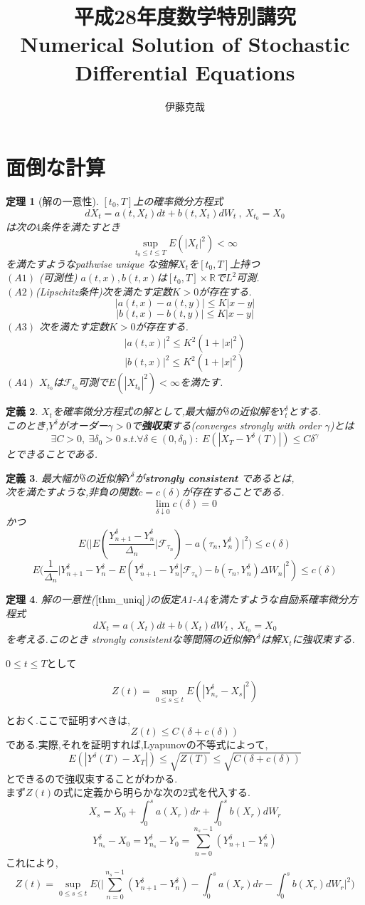 \documentclass[a4paper,dvipdfmx]{jreport}
\title{平成28年度数学特別講究\\Numerical Solution of Stochastic Differential Equations}
\author{伊藤克哉}
\def\qedsymbol{$\square$}
\def\proofname{\gt{証明}\;}
\newenvironment{Proof}{\par\noindent{\it\proofname}}{{\unskip\nobreak\hfill{\it\qedsymbol}}\par\vskip 9pt}
\newtheorem{Thm}     {定理}
\newtheorem{Def}     [Thm]{定義}
\renewenvironment{leftbar}{%
  \def\FrameCommand{\vrule width 1pt \hspace{10pt}}%
  \MakeFramed {\advance\hsize-\width \FrameRestore}}%
 {\endMakeFramed}
\def\R{\mathbb R}
\def\F{\mathcal F}
\def\thm{\begin{leftbar}\begin{Thm}}
\def\thmx{\end{Thm}\end{leftbar}}
\def\defb{\begin{leftbar}\begin{Def}}
\def\defx{\end{Def}\end{leftbar}}
\def\proof{\begin{Proof}}
\def\gt{>}
\begin{document}
\section{面倒な計算}
\thm[解の一意性]
\label{thm_uniq}
$[t_0,T]$上の確率微分方程式
\[
dX_t = a(t,X_t)dt + b(t,X_t)dW_t \ ,\ X_{t_0} =X_0
\]
は次の$4$条件を満たすとき
\[
\sup_{t_0\le t\le T} E(|X_t|^2) < \infty
\]
を満たすようなpathwise unique な強解$X_t$を$[t_0,T]$上持つ\\
$(A1)$ (可測性) $a(t,x),b(t,x)$は$[t_0,T] \times\R$で$L^2$可測.\\
$(A2)$(Lipschitz条件)次を満たす定数$K>0$が存在する.
\[
|a(t,x) - a(t,y) | \le K |x-y|
\]
\[
|b(t,x) - b(t,y) | \le K |x-y|
\]
$(A3)$ 次を満たす定数$K>0$が存在する.
\[
|a(t,x)|^2 \le K^2 (1+|x|^2)
\]
\[
|b(t,x)|^2 \le K^2 (1+|x|^2)
\]
$(A4)$
$X_{t_0}$は$\F_{t_0}$可測で$E(|X_{t_0}|^2)<\infty$を満たす.
\thmx
\defb
$X_t$を確率微分方程式の解として,最大幅が$\delta$の近似解を$Y_t^\delta$とする.\\
このとき,$Y^\delta$がオーダー$\gamma > 0$で{\bf 強収束}する(converges strongly with order $\gamma$)とは
\[
\exists C > 0 ,\ \exists \delta_0 > 0 \ s.t.  \forall \delta \in (0,\delta_0) : \ E(|X_T - Y^\delta(T) | ) \le C\delta^\gamma
\]
とできることである.
\defx

\defb
最大幅が$\delta$の近似解$Y^\delta$が{\bf strongly consistent} であるとは,\\
次を満たすような,非負の関数$c = c(\delta)$が存在することである.
\[
\lim_{\delta \downarrow 0} c(\delta) = 0 
\]
かつ
\[
E \big( \big| E( \frac{Y^\delta_{n+1} - Y^\delta_n}{\Delta_n} | \F_{\tau_n})
- a(\tau_n,Y_n^\delta)
 \big|^2 \big)   \le c(\delta)
\]
\[
E(\frac{1}{\Delta_n} | Y^\delta_{n+1} - Y^\delta_n
- E(Y^\delta_{n+1} - Y^\delta_n | \F_{\tau_n})
- b(\tau_n,Y_n^\delta)\Delta W_n|^2) \le c(\delta)
\]
\defx
\thm

解の一意性($\ref{thm_uniq}$)の仮定A1-A4を満たすような自励系確率微分方程式
\[
dX_t = a(X_t)dt + b(X_t)dW_t \ ,\ X_{t_0} =X_0
\]
を考える.このとき strongly consistentな等間隔の近似解$Y^\delta$は解$X_t$に強収束する.
\thmx
\proof

$0 \le t \le T$として

\[
Z(t) = \sup_{0\le s\le t} E(|Y_{n_s}^\delta - X_s|^2)
\]

とおく.ここで証明すべきは,
\[
Z(t) \le C(\delta + c(\delta))
\]
である.実際,それを証明すれば,Lyapunovの不等式によって,
\[
E(|Y^\delta(T) - X_T|) \le \sqrt{Z(T)} \le \sqrt{C(\delta+c(\delta))}
\]
とできるので強収束することがわかる.\\
まず$Z(t)$の式に定義から明らかな次の2式を代入する.
\[
X_s = X_0 + \int_0^s a(X_r)dr + \int_0^s b(X_r) dW_r
\]
\[
Y_{n_s}^\delta - X_0 =  Y_{n_s}^\delta - Y_0 = \sum_{n=0}^{n_s-1}(Y_{n+1}^\delta - Y_n^\delta)
\]
これにより,
\[
Z(t) = \sup_{0\le s\le t}  E 
\big(  \big|
 \sum_{n=0}^{n_s-1}(Y_{n+1}^\delta - Y_n^\delta) - \int_0^s a(X_r)dr - \int_0^s b(X_r) dW_r
\big| ^2 \big)
\]
\end{document}
